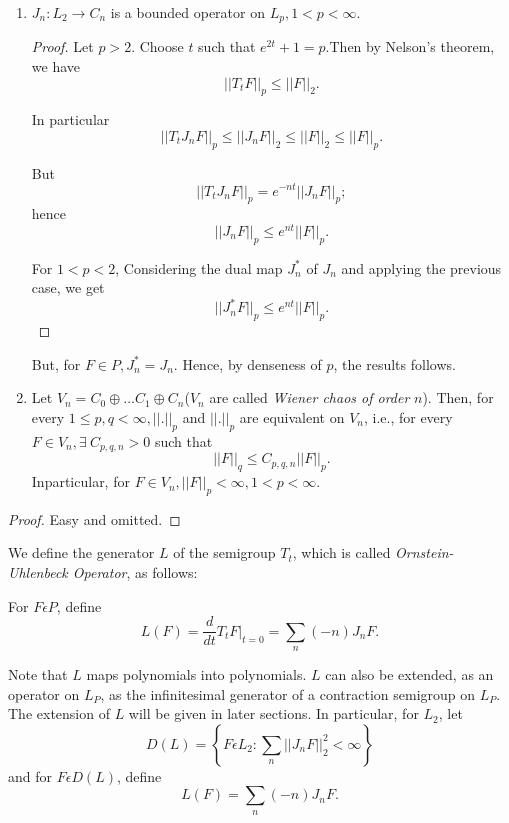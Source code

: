 \medskip
{}\pageoriginale 
\begin{enumerate}
\renewcommand{\labelenumi}{\theenumi)}
\item  $J_n: L_2 \to C_n$ is a bounded operator on $L_p, 1 < p < \infty$. 
  \begin{proof}
    Let  $p > 2$. Choose $t$ such that $e^{2t} + 1 = p$.Then by Nelson's
    theorem, we have  
    $$
    || T_t F||_p \leq || F ||_2.
    $$

    In particular 
    $$
    || T_t J_n F|| _p \leq || J_n F ||_2 \leq ||F||_2 \leq ||F||_p. 
    $$

    But 
    $$
    || T_t J_n F|| _p = e^{-nt}|| J_n F|| _p;
    $$
    hence 
    $$
    ||J_n F|| _p \leq e^{nt}|| F ||_p.
    $$
    
    For $1 < p < 2$, Considering the dual map $J^*_n$ of $J_n$ and
    applying the previous case, we get  
    $$
    ||J^*_n F ||_p \leq e^{nt} || F||_p.
    $$
  \end{proof}    
    But, for $F \in P, J^*_n = J_n$. Hence, by denseness of $p$, the
    results follows.  

\item Let $V_n = C_0 \oplus \ldots C_1 \oplus 
  C_n$($V_n$ are called \textit{ Wiener chaos of order} $n$). Then,
  for every $1 \leq p, q < \infty, ||. ||_p$ and $||. ||_p$ are
  equivalent on $V_n$, i.e.,  for every $F \in V_n, \exists~ C_{p, q, n}
  > 0 $ such that  
  $$
  || F ||_q \leq C_{p, q, n}|| F ||_p.
  $$
In\pageoriginale particular, for $F \in V_n, || F ||_p < \infty, 1 < p < \infty$.
\end{enumerate}

\begin{proof}
  Easy and omitted.
\end{proof}

\begin{definition}%
We define the generator $L$ of the semigroup $T_t$, which is called
\textit{Ornstein-Uhlenbeck Operator}, as follows: 
\end{definition}

For $F \epsilon  P$, define
$$
L(F) = \frac{d}{dt} T_tF|_{t=0} = \sum_n (-n) J_n F.
$$

Note that $L$ maps polynomials into polynomials. $L$ can also be
extended, as an operator on $L_P$, as the infinitesimal generator of a
contraction semigroup on $L_P$. The extension of $L$ will be given in
later sections. In particular, for $L_2$, let 
$$
D(L) = \left\{F \epsilon  L_2: \sum_n || J_n F ||^2_2 < \infty \right\}
$$
and for $F \epsilon  D (L)$, define
$$
L(F) = \sum_n (-n) J_n F.
$$

